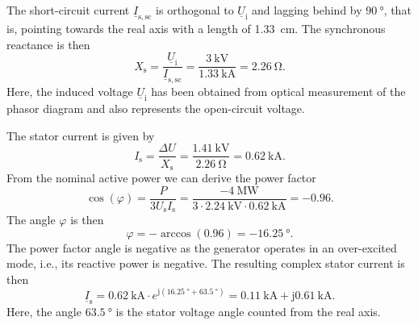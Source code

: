 \begin{solutionblock}
    The short-circuit current $\underline{I}_\mathrm{s,sc}$ is orthogonal to $\underline{U}_\mathrm{i}$ and lagging behind by $\SI{90}{\degree}$, that is, pointing towards the real axis with a length of \SI{1.33}{\cm}. The synchronous reactance is then
    $$X_\mathrm{s} = \frac{\underline{U}_\mathrm{i}}{\underline{I}_\mathrm{s,sc}} = \frac{\SI{3}{\kilo\volt}}{\SI{1.33}{\kilo\ampere}} = \SI{2.26}{\ohm}.$$
    Here, the induced voltage $\underline{U}_\mathrm{i}$ has been obtained from optical measurement of the phasor diagram and also represents the open-circuit voltage.
\end{solutionblock}



\begin{solutionblock}
    The stator current is given by
    $$I_\mathrm{s} = \frac{\Delta U}{X_\mathrm{s}} = \frac{\SI{1.41}{\kilo\volt}}{\SI{2.26}{\ohm}} = \SI{0.62}{\kilo\ampere}.$$
    From the nominal active power we can derive the power factor
    $$\cos(\varphi) = \frac{P}{3 U_\mathrm{s} I_\mathrm{s}} = \frac{\SI{-4}{\mega\watt}}{3 \cdot \SI{2.24}{\kilo\volt} \cdot \SI{0.62}{\kilo\ampere}} = -0.96.$$
    The angle $\varphi$ is then
    $$\varphi = -\arccos(0.96) = \SI{-16.25}{\degree}.$$
    The power factor angle is negative as the generator operates in an over-excited mode, i.e., its reactive power is negative. The resulting complex stator current is then $$\underline{I}_\mathrm{s} = \SI{0.62}{\kilo\ampere} \cdot e^{\mathrm{j}(\SI{16.25}{\degree} + \SI{63.5}{\degree})}  = \SI{0.11}{\kilo\ampere} + \mathrm{j} \SI{0.61}{\kilo\ampere}.$$
    Here, the angle $\SI{63.5}{\degree}$ is the stator voltage angle counted from the real axis.
\end{solutionblock}

